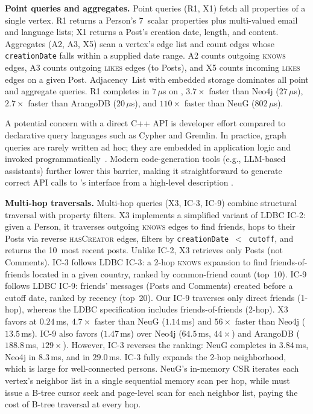 \textbf{Point queries and aggregates.}
Point queries (R1, X1) fetch all properties of a single vertex.
R1 returns a Person's 7~scalar properties plus multi-valued email and language
lists; X1 returns a Post's creation date, length, and content.
Aggregates (A2, A3, X5) scan a vertex's edge list and count edges
whose \texttt{creationDate} falls within a supplied date range.
A2 counts outgoing \textsc{knows} edges, A3 counts outgoing \textsc{likes}
edges (to Posts), and X5 counts incoming \textsc{likes} edges on a given Post.
\project{} Adjacency~List with embedded storage dominates all point and aggregate queries.
R1 completes in $7$\,$\mu$s on \project{}, $3.7\times$ faster than Neo4j ($27$\,$\mu$s), $2.7\times$ faster than ArangoDB ($20$\,$\mu$s), and $110\times$ faster than NeuG ($802$\,$\mu$s).

A potential concern with a direct C++ API is developer effort compared to declarative query languages such as Cypher and Gremlin.
In practice, graph queries are rarely written ad hoc; they are embedded in application logic and invoked programmatically~\cite{10.1145/3357766.3359541,cheung2013optimizing}.
Modern code-generation tools (e.g., LLM-based assistants) further lower this barrier, making it straightforward to generate correct API calls to \project{}'s interface from a high-level description \cite{lyu2026text2gqlbenchtextgraphquery}.

\textbf{Multi-hop traversals.}
Multi-hop queries (X3, IC-3, IC-9) combine structural traversal
with property filters.
X3 implements a simplified variant of LDBC IC-2: given a Person, it traverses
outgoing \textsc{knows} edges to find friends, hops to their Posts via reverse
\textsc{hasCreator} edges, filters by \texttt{creationDate~$<$~cutoff}, and
returns the 10~most recent posts.
Unlike IC-2, X3 retrieves only Posts (not Comments).
IC-3 follows LDBC IC-3: a 2-hop \textsc{knows} expansion to find
friends-of-friends located in a given country, ranked by common-friend count
(top~10).
IC-9 follows LDBC IC-9: friends' messages (Posts and Comments) created before a
cutoff date, ranked by recency (top~20).
Our IC-9 traverses only direct friends (1-hop), whereas the LDBC specification
includes friends-of-friends (2-hop).
%
X3 favors \project{} at $0.24$\,ms, $4.7\times$ faster than NeuG ($1.14$\,ms) and $56\times$ faster than Neo4j ($13.5$\,ms).
IC-9 also favors \project{} ($1.47$\,ms) over Neo4j ($64.5$\,ms, $44\times$) and ArangoDB ($188.8$\,ms, $129\times$).
However, IC-3 reverses the ranking: NeuG completes in $3.84$\,ms, Neo4j in $8.3$\,ms, and \project{} in $29.0$\,ms.
IC-3 fully expands the 2-hop  neighborhood, which is large for well-connected persons.
NeuG's in-memory CSR iterates each vertex's neighbor list in a single sequential memory scan per hop, while \project{} must issue a \wt{} B-tree cursor seek and page-level scan for each neighbor list, paying the cost of B-tree traversal at every hop.

